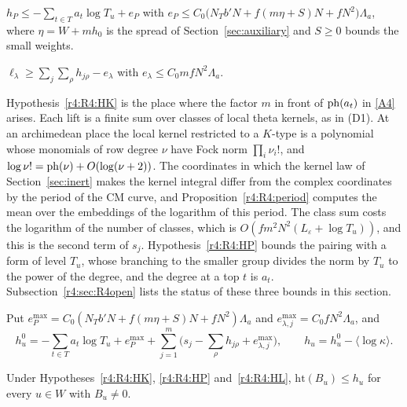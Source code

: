 \begin{hypothesis}\label{r4:R4:HP}
$h_P\le-\sum_{t\in T}a_t\log T_u+e_P$ with $e_P\le C_0\big(N_Tb'N+f(m\eta+S)N+fN^2\big)\Lambda_a$, where $\eta=W+mh_0$ is the spread of Section~\ref{sec:auxiliary} and $S\ge0$ bounds the small weights.
\end{hypothesis}

\begin{hypothesis}\label{r4:R4:HL}
$\ell_\lambda\ge\sum_j\sum_\rho h_{j\rho}-e_\lambda$ with $e_\lambda\le C_0mfN^2\Lambda_a$.
\end{hypothesis}

\begin{remark}\label{r4:R4:HKmech}
Hypothesis~\ref{r4:R4:HK} is the place where the factor $m$ in front of $\operatorname{ph}(a_t)$ in \eqref{A4} arises. Each lift is a finite sum over classes of local theta kernels, as in (D1). At an archimedean place the local kernel restricted to a $K$-type is a polynomial whose monomials of row degree $\nu$ have Fock norm $\prod_i\nu_i!$, and $\log\nu!=\operatorname{ph}(\nu)+O(\log(\nu+2))$. The coordinates in which the kernel law of Section~\ref{sec:inert} makes the kernel integral differ from the complex coordinates by the period of the CM curve, and Proposition~\ref{r4:R4:period} computes the mean over the embeddings of the logarithm of this period. The class sum costs the logarithm of the number of classes, which is $O(fm^2N^2(L_\varepsilon+\log T_u))$, and this is the second term of $s_j$. Hypothesis~\ref{r4:R4:HP} bounds the pairing with a form of level $T_u$, whose branching to the smaller group divides the norm by $T_u$ to the power of the degree, and the degree at a top $t$ is $a_t$. Subsection~\ref{r4:sec:R4open} lists the status of these three bounds in this section.
\end{remark}

\begin{definition}\label{r4:R4:hu}
Put $e_P^{\max}=C_0(N_Tb'N+f(m\eta+S)N+fN^2)\Lambda_a$ and $e^{\max}_{\lambda,j}=C_0fN^2\Lambda_a$, and
\[
h^0_u=-\sum_{t\in T}a_t\log T_u+e_P^{\max}+\sum_{j=1}^m\Big(s_j-\sum_\rho h_{j\rho}+e^{\max}_{\lambda,j}\Big),\qquad h_u=h^0_u-\langle\log\kappa\rangle .
\]
\end{definition}

\begin{corollary}\label{r4:R4:htcor}
Under Hypotheses~\ref{r4:R4:HK}, \ref{r4:R4:HP} and~\ref{r4:R4:HL}, $\mathrm{ht}(B_u)\le h_u$ for every $u\in W$ with $B_u\ne0$.
\end{corollary}

